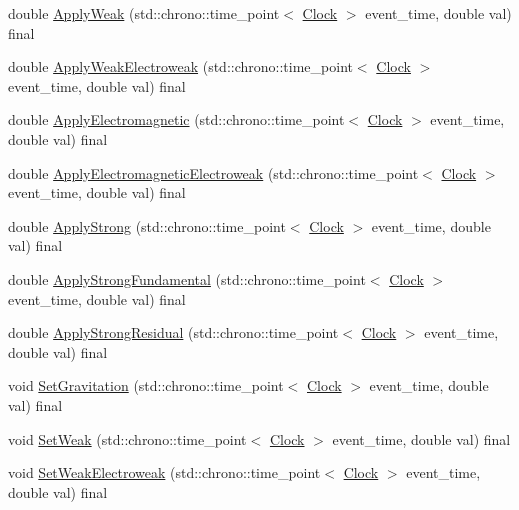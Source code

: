 \begin{DoxyCompactItemize}
\item 
double \hyperlink{class_monomer_a176a1a4dfed1eaddc6637bbfd2660aba}{Apply\+Weak} (std\+::chrono\+::time\+\_\+point$<$ \hyperlink{universe_8h_a0ef8d951d1ca5ab3cfaf7ab4c7a6fd80}{Clock} $>$ event\+\_\+time, double val) final
\item 
double \hyperlink{class_monomer_a64f65c128ebc2428c42739c930696ea1}{Apply\+Weak\+Electroweak} (std\+::chrono\+::time\+\_\+point$<$ \hyperlink{universe_8h_a0ef8d951d1ca5ab3cfaf7ab4c7a6fd80}{Clock} $>$ event\+\_\+time, double val) final
\item 
double \hyperlink{class_monomer_ae64dfbf82610ae26427be9c824aef70f}{Apply\+Electromagnetic} (std\+::chrono\+::time\+\_\+point$<$ \hyperlink{universe_8h_a0ef8d951d1ca5ab3cfaf7ab4c7a6fd80}{Clock} $>$ event\+\_\+time, double val) final
\item 
double \hyperlink{class_monomer_a4c3f9894ea57047789bec32602f033cb}{Apply\+Electromagnetic\+Electroweak} (std\+::chrono\+::time\+\_\+point$<$ \hyperlink{universe_8h_a0ef8d951d1ca5ab3cfaf7ab4c7a6fd80}{Clock} $>$ event\+\_\+time, double val) final
\item 
double \hyperlink{class_monomer_acba5091693082fdf2d28f1a5a4ae19a1}{Apply\+Strong} (std\+::chrono\+::time\+\_\+point$<$ \hyperlink{universe_8h_a0ef8d951d1ca5ab3cfaf7ab4c7a6fd80}{Clock} $>$ event\+\_\+time, double val) final
\item 
double \hyperlink{class_monomer_aa186454670f7796e196509238d419a35}{Apply\+Strong\+Fundamental} (std\+::chrono\+::time\+\_\+point$<$ \hyperlink{universe_8h_a0ef8d951d1ca5ab3cfaf7ab4c7a6fd80}{Clock} $>$ event\+\_\+time, double val) final
\item 
double \hyperlink{class_monomer_a921f7add2d446b8670513220ace6c4b2}{Apply\+Strong\+Residual} (std\+::chrono\+::time\+\_\+point$<$ \hyperlink{universe_8h_a0ef8d951d1ca5ab3cfaf7ab4c7a6fd80}{Clock} $>$ event\+\_\+time, double val) final
\item 
void \hyperlink{class_monomer_ab38d44b27a46d5630aeb5e889f927c09}{Set\+Gravitation} (std\+::chrono\+::time\+\_\+point$<$ \hyperlink{universe_8h_a0ef8d951d1ca5ab3cfaf7ab4c7a6fd80}{Clock} $>$ event\+\_\+time, double val) final
\item 
void \hyperlink{class_monomer_ad4fe1db33f493575281e1a2fb35004ca}{Set\+Weak} (std\+::chrono\+::time\+\_\+point$<$ \hyperlink{universe_8h_a0ef8d951d1ca5ab3cfaf7ab4c7a6fd80}{Clock} $>$ event\+\_\+time, double val) final
\item 
void \hyperlink{class_monomer_ab887d7cfd2ecb557efb3ace59852019c}{Set\+Weak\+Electroweak} (std\+::chrono\+::time\+\_\+point$<$ \hyperlink{universe_8h_a0ef8d951d1ca5ab3cfaf7ab4c7a6fd80}{Clock} $>$ event\+\_\+time, double val) final

\end{DoxyCompactItemize}
